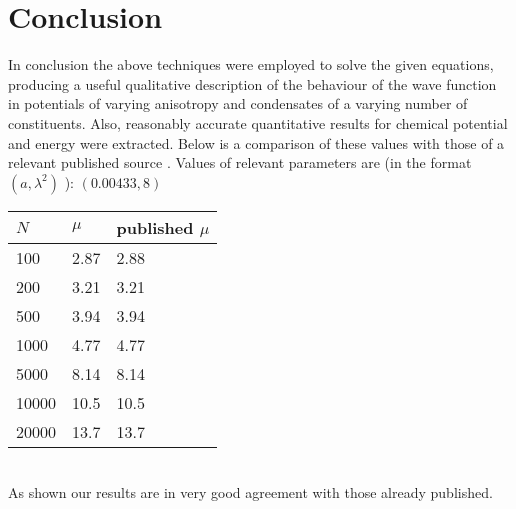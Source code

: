 \documentclass{article}
\begin{document}
\section{Conclusion}

In conclusion the above techniques were employed to solve the given equations,
producing a useful qualitative description of the behaviour of the wave
function in potentials of varying anisotropy and condensates of a varying number
of constituents. Also, reasonably accurate quantitative results for chemical potential
and energy were extracted. Below is a comparison of these values with those of a
relevant published source \cite{7}. Values of relevant parameters are (in the format
$(a, \lambda^{2})$ ):
$(0.00433, 8)$\\

\begin{tabular}[!htb]{|l|l|l|}
\hline
$N$&	$\mu$&	published $\mu$\\
\hline
100&	2.87&		2.88\\
\hline
200&	3.21&		3.21\\
\hline
500&	3.94&		3.94\\
\hline
1000&	4.77&		4.77\\
\hline
5000&	8.14&		8.14\\
\hline
10000&	10.5&		10.5\\
\hline
20000&	13.7&		13.7\\
\hline
\end{tabular}
 \\


As shown our results are in very good agreement with those already published. 
\end{document}
